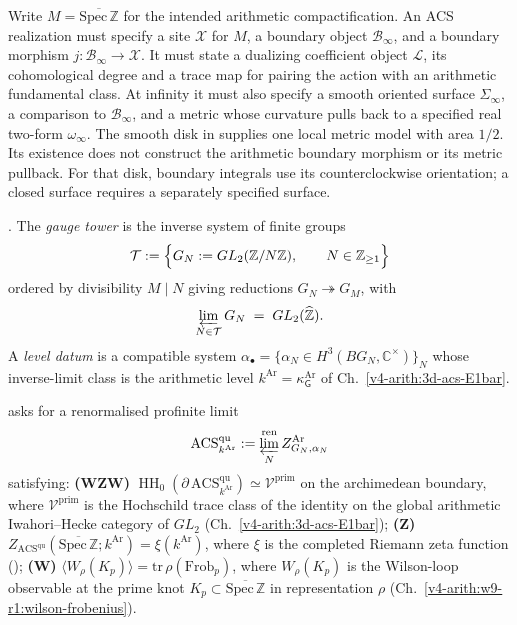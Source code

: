 \begin{definition}
\label{v4-arith:w10-a:def:3space}
Write \(M=\overline{\mathrm{Spec}\,\mathbb Z}\) for the intended
arithmetic compactification. An ACS realization must specify a site
\(\mathscr X\) for \(M\), a boundary object \(\mathscr B_\infty\),
and a boundary morphism \(j:\mathscr B_\infty\to\mathscr X\).
It must state a dualizing coefficient object \(\mathcal L\), its
cohomological degree and a trace map for pairing the action with
an arithmetic fundamental class.
At infinity it must also specify a smooth oriented surface
\(\Sigma_\infty\), a comparison to \(\mathscr B_\infty\), and a
metric whose curvature pulls back to a specified real two-form
\(\omega_\infty\). The smooth disk in
 supplies one local metric
model with area \(1/2\). Its existence does not construct the
arithmetic boundary morphism or its metric pullback.
For that disk, boundary integrals use its counterclockwise orientation;
a closed surface requires a separately specified surface.
\end{definition}
\begin{definition}
\label{v4-arith:w10-a:def:tower}
\ClaimStatusDefinitional. The \emph{gauge tower} is the inverse
system of finite groups
\[
\mathcal{T}:=\Bigl\{
G_{N}:=GL_{2}(\mathbb Z/N\mathbb Z),\qquad N\in\mathbb Z_{\geq 1}
\Bigr\}
\]
ordered by divisibility \(M\mid N\) giving reductions \(G_{N}\twoheadrightarrow G_{M}\), with
\[
\varprojlim_{N\in\mathcal{T}}G_{N}\;=\;GL_{2}(\widehat{\mathbb{Z}}).
\]
A \emph{level datum} is a compatible system
\(\alpha_{\bullet}=\{\alpha_{N}\in H^{3}(BG_{N},\mathbb C^{\times})\}_{N}\)
whose inverse-limit class is the arithmetic level
\(k^{\mathrm{Ar}}=\kappa^{\mathrm{Ar}}_{\mathsf G}\) of
Ch.~\ref{v4-arith:3d-acs-E1bar}.
\end{definition}

\begin{remark}
\label{v4-arith:w10-a:rem:axioms}
 asks for a renormalised profinite
limit
\[
\mathrm{ACS}^{\mathrm{qu}}_{k^{\mathrm{Ar}}}
:=\varprojlim_{N}^{\mathrm{ren}}Z^{\mathrm{Ar}}_{G_{N},\alpha_{N}}
\]
satisfying:
\textbf{(WZW)}
\(\operatorname{HH}_{0}
(\partial\,\mathrm{ACS}^{\mathrm{qu}}_{k^{\mathrm{Ar}}})
\simeq\mathcal{V}^{\mathrm{prim}}\) on the archimedean boundary, where
\(\mathcal{V}^{\mathrm{prim}}\) is the Hochschild trace class of the
identity on the global arithmetic Iwahori--Hecke category of \(GL_{2}\)
(Ch.~\ref{v4-arith:3d-acs-E1bar});
\textbf{(Z)} \(Z_{\mathrm{ACS}^{\mathrm{qu}}}(\overline{\mathrm{Spec}\,\mathbb Z};k^{\mathrm{Ar}})=\xi(k^{\mathrm{Ar}})\),
where \(\xi\) is the completed Riemann zeta function
();
\textbf{(W)} \(\langle W_{\rho}(K_{p})\rangle=\mathrm{tr}\,\rho(\mathrm{Frob}_{p})\),
where \(W_{\rho}(K_{p})\) is the Wilson-loop observable at the prime knot \(K_{p}\subset\overline{\mathrm{Spec}\,\mathbb{Z}}\)
in representation \(\rho\) (Ch.~\ref{v4-arith:w9-r1:wilson-frobenius}).
\end{remark}

